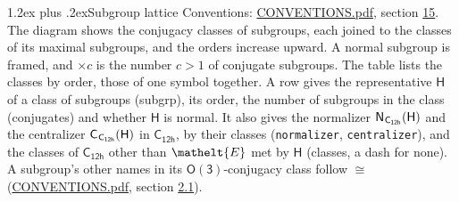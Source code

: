 \documentclass[10pt,a4paper]{article}
\makeatletter
\renewcommand\section{\@startsection{section}{1}{\z@}{-3ex plus -1ex minus -.2ex}%
  {1.2ex plus .2ex}{\normalfont\large\sffamily\bfseries\color{parttitle}}}
\numberwithin{equation}{section}
\newcommand{\eltfont}[1]{{\let\sigma\eltsigma\mathelt{#1}}}
\newcommand{\grp}[1]{\mathsf{#1}}
\newcommand{\cls}[1]{\eltfont{#1}}
\newcommand{\samecls}{\cong}
\newcommand{\hairsp}{\mkern1mu}
\makeatother
\begin{document}
\section{Subgroup lattice}\label{s:subgroups}
Conventions: \href{../../CONVENTIONS.pdf}{CONVENTIONS.pdf}, section \href{../../CONVENTIONS.pdf\#conv.15}{15}.
The diagram shows the conjugacy classes of subgroups, each joined to the classes of its maximal subgroups, and the orders increase upward. \label{n:index.conjugates.c}A normal subgroup is framed, and ${\times}c$ is the number $c > 1$ of conjugate subgroups. The table lists the classes by order, those of one symbol together. \label{n:group.H}\label{n:head.subgroup}\label{n:head.order}\label{n:head.conjugates}\label{n:head.normal}A row gives the representative $\grp{H}$ of a class of subgroups (subgrp), its order, the number of subgroups in the class (conjugates) and whether $\grp{H}$ is normal. \label{n:group.normalizer}\label{n:group.centralizer}\label{n:head.classes}It also gives the normalizer $\grp{N}_{\hairsp \grp{C_{12h}}}(\grp{H})$ and the centralizer $\grp{C}_{\hairsp \grp{C_{12h}}}(\grp{H})$ in $\grp{C_{12h}}$, by their classes (\texttt{normalizer}, \texttt{centralizer}), and the classes of $\grp{C_{12h}}$ other than $\cls{E}$ met by $\grp{H}$ (classes, a dash for none). A subgroup's other names in its \href{O3.pdf}{$\grp{O(3)}$}-conjugacy class follow $\samecls$ (\href{../../CONVENTIONS.pdf}{CONVENTIONS.pdf}, section \href{../../CONVENTIONS.pdf\#conv.2.1}{2.1}).
\end{document}
